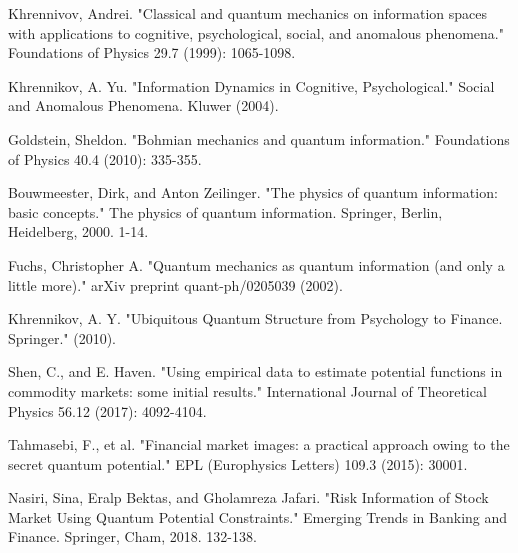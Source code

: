 \documentclass[a4paper,titlepage,12pt,fleqn,oneside]{report}
\begin{document}
\begin{thebibliography}{99}
\begin{LTRitems}
	Khrennivov, Andrei. "Classical and quantum mechanics on information spaces with applications to cognitive, psychological, social, and anomalous phenomena." Foundations of Physics 29.7 (1999): 1065-1098.
\end{LTRitems}

\begin{LTRitems}
	Khrennikov, A. Yu. "Information Dynamics in Cognitive, Psychological." Social and Anomalous Phenomena. Kluwer (2004).
\end{LTRitems}

\begin{LTRitems}
	Goldstein, Sheldon. "Bohmian mechanics and quantum information." Foundations of Physics 40.4 (2010): 335-355.
\end{LTRitems}

\begin{LTRitems}
	Bouwmeester, Dirk, and Anton Zeilinger. "The physics of quantum information: basic concepts." The physics of quantum information. Springer, Berlin, Heidelberg, 2000. 1-14.
\end{LTRitems}

\begin{LTRitems}
	Fuchs, Christopher A. "Quantum mechanics as quantum information (and only a little more)." arXiv preprint quant-ph/0205039 (2002).
\end{LTRitems}

\begin{LTRitems}
	Khrennikov, A. Y. "Ubiquitous Quantum Structure from Psychology to Finance. Springer." (2010).
\end{LTRitems}

\begin{LTRitems}
	Shen, C., and E. Haven. "Using empirical data to estimate potential functions in commodity markets: some initial results." International Journal of Theoretical Physics 56.12 (2017): 4092-4104.
\end{LTRitems}

\begin{LTRitems}
	Tahmasebi, F., et al. "Financial market images: a practical approach owing to the secret quantum potential." EPL (Europhysics Letters) 109.3 (2015): 30001.
\end{LTRitems}

\begin{LTRitems}
	Nasiri, Sina, Eralp Bektas, and Gholamreza Jafari. "Risk Information of Stock Market Using Quantum Potential Constraints." Emerging Trends in Banking and Finance. Springer, Cham, 2018. 132-138.
\end{LTRitems}


\end{thebibliography}
\end{document}

